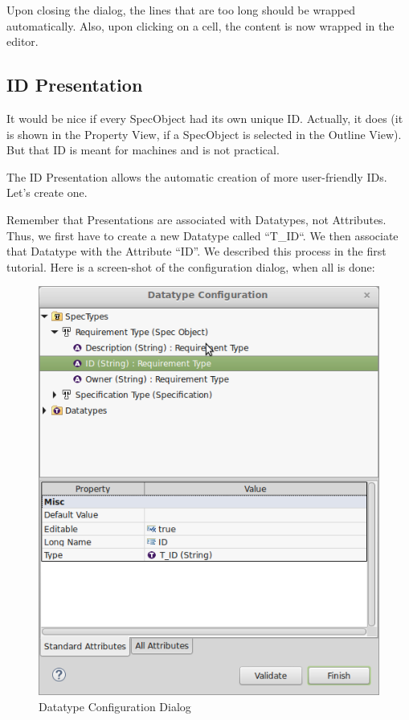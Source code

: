 Upon closing the dialog, the lines that are too long should be wrapped automatically.  Also, upon clicking on a cell, the content is now wrapped in the editor.

\subsection{ID Presentation}

It would be nice if every SpecObject had its own unique ID.  Actually, it does (it is shown in the Property View, if a SpecObject is selected in
the Outline View).  But that ID is meant for machines and is not practical.

The ID Presentation allows the automatic creation of more user-friendly IDs.  Let's create one.

Remember that Presentations are associated with Datatypes, not Attributes.  Thus, we first have to create a new Datatype called ``T\_ID``.  We then associate that Datatype with the Attribute ``ID''.  We described this process in the first tutorial.  Here is a screen-shot of the configuration dialog, when all is done:

\begin{figure}[h!]
\centering      
\includegraphics[width=0.8\linewidth]{../rmf-images/t_id.png}      
\caption{Datatype Configuration Dialog}      
\label{fig:datatypeConfig}
\end{figure}

